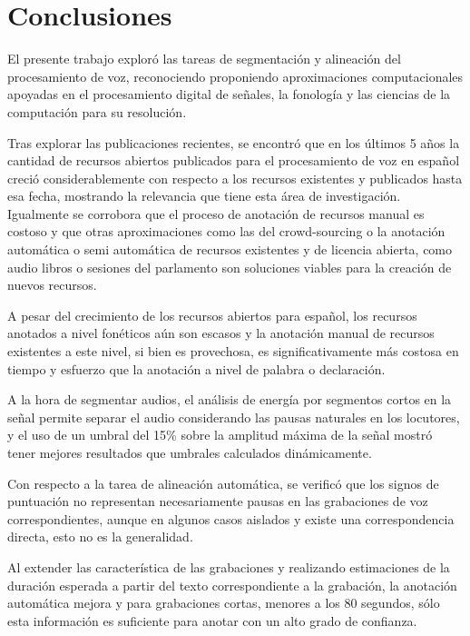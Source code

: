 \chapter{Conclusiones}

El presente trabajo exploró las tareas de segmentación y alineación del procesamiento de voz, reconociendo proponiendo aproximaciones computacionales apoyadas en el procesamiento digital de señales, la fonología y las ciencias de la computación para su resolución.

Tras explorar las publicaciones recientes, se encontró que en los últimos 5 años la cantidad de recursos abiertos publicados para el procesamiento de voz en español creció considerablemente con respecto a los recursos existentes y publicados hasta esa fecha, mostrando la relevancia que tiene esta área de investigación. Igualmente se corrobora que el proceso de anotación de recursos manual es costoso y que otras aproximaciones como las del crowd-sourcing o la anotación automática o semi automática de recursos existentes y de licencia abierta, como audio libros o sesiones del parlamento son soluciones viables para la creación de nuevos recursos.

A pesar del crecimiento de los recursos abiertos para español, los recursos anotados a nivel fonéticos aún son escasos y la anotación manual de recursos existentes a este nivel, si bien es provechosa, es significativamente m\'as costosa en tiempo y esfuerzo que la anotación a nivel de palabra o declaración.

A la hora de segmentar audios, el análisis de energía por segmentos cortos en la señal permite separar el audio considerando las pausas naturales en los locutores, y el uso de un umbral del 15\% sobre la amplitud máxima de la señal mostró tener mejores resultados que umbrales calculados dinámicamente.

Con respecto a la tarea de alineación automática, se verificó que los signos de puntuación no representan necesariamente pausas en las grabaciones de voz correspondientes, aunque en algunos casos aislados y existe una correspondencia directa, esto no es la generalidad. 

Al extender las característica de las grabaciones y realizando estimaciones de la duración esperada a partir del texto correspondiente a la grabación, la anotación automática mejora y para grabaciones cortas, menores a los 80 segundos, s\'olo esta información es suficiente para anotar con un alto grado de confianza.

